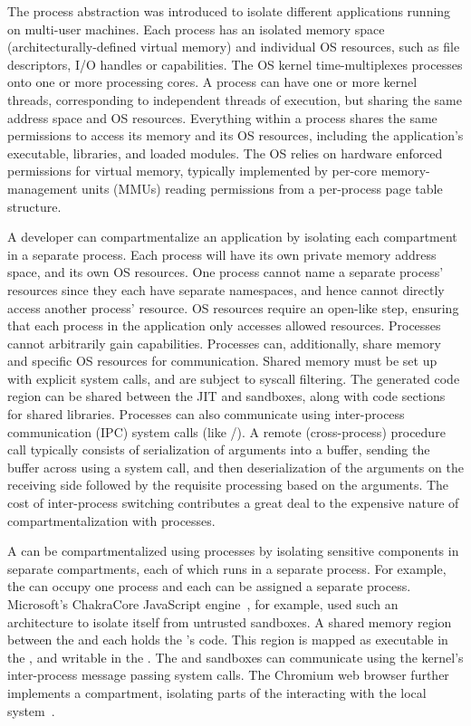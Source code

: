 The process abstraction was introduced to isolate different applications running 
on multi-user machines.
Each process has an isolated memory space (architecturally-defined virtual memory)
and individual OS resources, such as file descriptors, I/O handles or capabilities.
The OS kernel time-multiplexes processes onto one or more processing cores.
A process can have one or more kernel threads, corresponding to independent threads
of execution, but sharing the same address space and OS resources.
Everything within a process shares the same permissions to access its memory and
its OS resources, including the application's executable, libraries, and loaded modules.
The OS relies on hardware enforced permissions for virtual memory, typically 
implemented by per-core memory-management units (MMUs) reading permissions from a
per-process page table structure.

A developer can compartmentalize an application by isolating each compartment in
a separate process.
Each process will have its own private memory address space, and its own 
OS resources.
One process cannot name a separate process' resources since they each have separate
namespaces, and hence cannot directly access another process' resource.
OS resources require an open-like step, ensuring that each process in the application
only accesses allowed resources.
Processes cannot arbitrarily gain capabilities.
Processes can, additionally, share memory and specific OS resources for 
communication.
Shared memory must be set up with explicit system calls, and are subject to 
syscall filtering.
The generated code region can be shared between the JIT and sandboxes, along
with code sections for shared libraries.
Processes can also communicate using inter-process communication (IPC) system 
calls (like /).
A remote (cross-process) procedure call typically consists of serialization of
arguments into a buffer, sending the buffer across using a system call,
and then deserialization of the arguments on the receiving side followed by
the requisite processing based on the arguments.
The cost of inter-process switching contributes a great
deal to the expensive nature of compartmentalization with processes.

A \browser can be compartmentalized using processes by isolating sensitive
components in separate compartments, each of which runs in a separate process.
For example, the \renderer can occupy one process and each \sandbox
can be assigned a separate process.
Microsoft's ChakraCore JavaScript engine~\cite{ChakraCore}, for example, 
used such an architecture to isolate itself from untrusted sandboxes.
A shared memory region between the \renderer and each \sandbox holds the 
\sandbox's code.
This region is mapped as executable in the \sandbox, and writable in the
\renderer.
The \renderer and sandboxes can communicate using the kernel's inter-process 
message passing system calls.
The Chromium web browser further implements a \local compartment,
isolating parts of the \browser interacting with the local 
system~\cite{barth2008security}.

